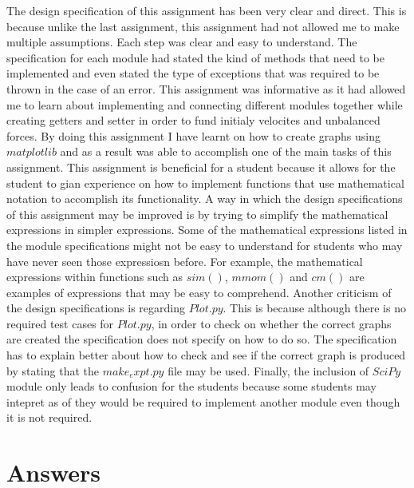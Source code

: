 \documentclass[12pt]{article}
\begin{document}
The design specification of this assignment has been very clear and direct. This is because unlike the last assignment, this assignment had not allowed me
to make multiple assumptions. Each step was clear and easy to understand. The specification for each module had stated the kind of methods that need to be
implemented and even stated the type of exceptions that was required to be thrown in the case of an error. This assignment was informative as it had allowed
me to learn about implementing and connecting different modules together while creating getters and setter in order to fund initialy velocites and unbalanced
forces. By doing this assignment I have learnt on how to create graphs using $matplotlib$ and as a result was able to accomplish one of the main tasks of 
this assignment. This assignment is beneficial for a student because it allows for the student to gian experience on how to implement functions that use
mathematical notation to accomplish its functionality. A way in which the design specifications of this assignment may be improved is by trying to simplify
the mathematical expressions in simpler expressions. Some of the mathematical expressions listed in the module specifications might not be easy to understand
for students who may have never seen those expressiosn before. For example, the mathematical expressions within functions such as $sim()$, $mmom()$ and 
$cm()$ are examples of expressions that may be easy to comprehend. Another criticism of the design specifications is regarding $Plot.py$. This is because
although there is no required test cases for $Plot.py$, in order to check on whether the correct graphs are created the specification does not specify on
how to do so. The specification has to explain better about how to check and see if the correct graph is produced by stating that the $make_expt.py$ file
may be used. Finally, the inclusion of $SciPy$ module only leads to confusion for the students because some students may intepret as of they would be 
required to implement another module even though it is not required.

\section{Answers}
\end{document}
